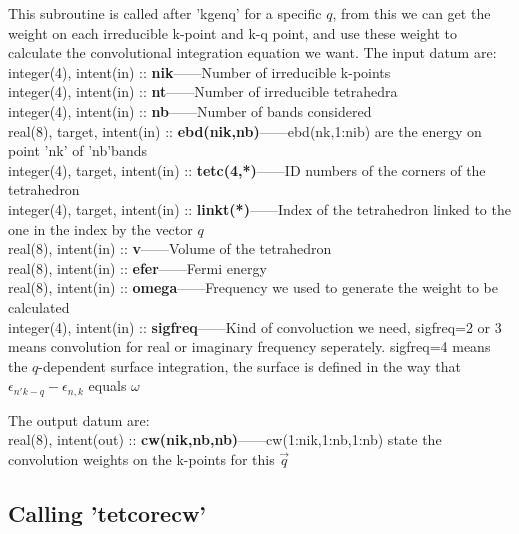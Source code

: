 \documentclass[10pt]{article}
\begin{document}
This subroutine is called after 'kgenq' for a specific $q$, from this we can get the weight on each irreducible k-point and k-q point, and use these weight to calculate the convolutional integration equation we want.  The input datum are:\\

integer(4), intent(in) :: \textbf{nik}------Number of irreducible k-points\\

integer(4), intent(in) :: \textbf{nt}------Number of irreducible tetrahedra\\

integer(4), intent(in) :: \textbf{nb}------Number of bands considered\\

real(8), target, intent(in) :: \textbf{ebd(nik,nb)}------ebd(nk,1:nib) are the energy on point 'nk' of 'nb'bands\\
     
integer(4), target, intent(in) :: \textbf{tetc(4,*)}------ID numbers of the corners of the tetrahedron\\

integer(4), target, intent(in) :: \textbf{linkt(*)}------Index of the tetrahedron linked to the one in the index by the vector $q$\\

real(8), intent(in) :: \textbf{v}------Volume of the tetrahedron\\

real(8), intent(in) :: \textbf{efer}------Fermi energy\\
      
real(8), intent(in) :: \textbf{omega}------Frequency we used to generate the weight to be calculated\\
      
integer(4), intent(in) :: \textbf{sigfreq}------Kind of convoluction we need, sigfreq=2 or 3 means convolution for real or imaginary frequency seperately. sigfreq=4 means the $q$-dependent surface integration, the surface is defined in the way that $\epsilon_{n'k-q}-\epsilon_{n,k}$ equals $\omega$

The output datum are:\\

real(8), intent(out) :: \textbf{cw(nik,nb,nb)}------cw(1:nik,1:nb,1:nb) state the convolution weights on the k-points for this $\vec{q}$\\

\subsection{Calling 'tetcorecw'}
\end{document}
